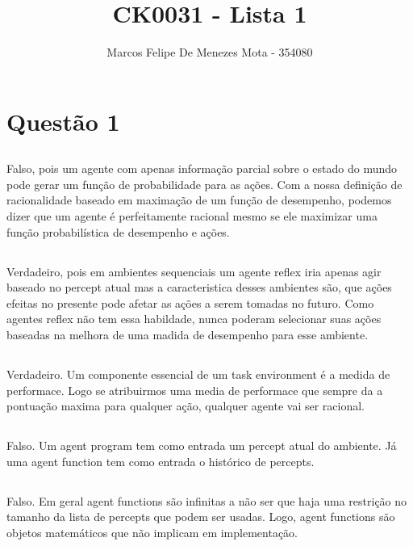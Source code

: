 \documentclass[a4paper,12pt]{article}
\title{CK0031 - Lista 1}
\author{Marcos Felipe De Menezes Mota - 354080}
\date{}
\begin{document}
\maketitle
\section{Questão 1}

\subsection{}
Falso, pois um agente com apenas informação parcial sobre o estado do mundo pode gerar um função de probabilidade para as ações. Com a nossa definição de racionalidade baseado em maximação de um função de desempenho, podemos dizer que um agente é perfeitamente racional mesmo se ele maximizar uma função probabilística de desempenho e ações.

\subsection{}
Verdadeiro, pois em ambientes sequenciais um agente reflex iria apenas agir baseado no percept atual mas a caracteristica desses ambientes são, que ações efeitas no presente pode afetar as ações a serem tomadas no futuro. Como agentes reflex não tem essa habildade, nunca poderam selecionar suas ações baseadas na melhora de uma madida de desempenho para esse ambiente.

\subsection{}
Verdadeiro. Um componente essencial de um task environment é a medida de performace. Logo se atribuirmos uma media de performace que sempre da a pontuação maxima para qualquer ação, qualquer agente vai ser racional.

\subsection{}
Falso. Um agent program tem como entrada um percept atual do ambiente. Já uma agent function tem como entrada o histórico de percepts.

\subsection{}
Falso. Em geral agent functions são infinitas a não ser que haja uma restrição no tamanho da lista de percepts que podem ser usadas. Logo, agent functions são objetos matemáticos que não implicam em implementação.
\end{document}
